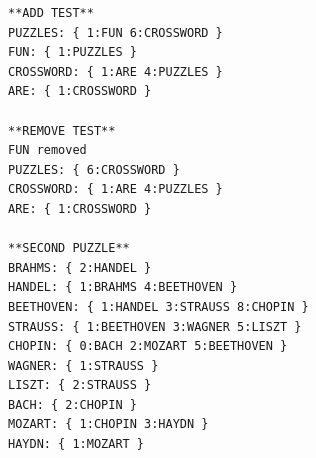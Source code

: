 \documentclass[a4paper]{article}
\begin{document}
\begin{large}
\begin{lstlisting}[caption=Main output]
**ADD TEST**
PUZZLES: { 1:FUN 6:CROSSWORD }
FUN: { 1:PUZZLES }
CROSSWORD: { 1:ARE 4:PUZZLES }
ARE: { 1:CROSSWORD }

**REMOVE TEST**
FUN removed
PUZZLES: { 6:CROSSWORD }
CROSSWORD: { 1:ARE 4:PUZZLES }
ARE: { 1:CROSSWORD }

**SECOND PUZZLE**
BRAHMS: { 2:HANDEL }
HANDEL: { 1:BRAHMS 4:BEETHOVEN }
BEETHOVEN: { 1:HANDEL 3:STRAUSS 8:CHOPIN }
STRAUSS: { 1:BEETHOVEN 3:WAGNER 5:LISZT }
CHOPIN: { 0:BACH 2:MOZART 5:BEETHOVEN }
WAGNER: { 1:STRAUSS }
LISZT: { 2:STRAUSS }
BACH: { 2:CHOPIN }
MOZART: { 1:CHOPIN 3:HAYDN }
HAYDN: { 1:MOZART }
\end{lstlisting}

\end{large}
\end{document}
